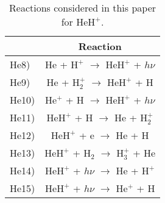 \documentclass[baaa]{baaa}
\begin{document}
\begin{table}[h!]
    \caption{Reactions considered in this paper for  $\mathrm{HeH^+}$.}
    \label{reacciones}


\centering
\begin{tabular}{lc} 

\hline\hline\noalign{\smallskip}
&  Reaction \\
\hline\noalign{\smallskip}

He8) & $\mathrm{He}$ + $\mathrm{H^+}$ $\longrightarrow$ $\mathrm{HeH^+}$ + $h\nu$ \\



He9)& $\mathrm{He}$ + $\mathrm{H_2 ^+}$ $\longrightarrow$ $\mathrm{HeH^+}$ + $\mathrm{H}$ \\

He10)& $\mathrm{He^+}$ + $\mathrm{H}$ $\longrightarrow$ $\mathrm{HeH^+}$ + $h\nu$ \\

He11)& $\mathrm{HeH^+}$ + $\mathrm{H}$ $\longrightarrow$ $\mathrm{He}$ + $\mathrm{H_2 ^+}$ \\

He12)& $\mathrm{HeH^+}$ + e $\longrightarrow$ $\mathrm{He}$ + $\mathrm{H}$ \\
He13) & $\mathrm{HeH^+}$ + $\mathrm{H_2}$ $\longrightarrow$ $\mathrm{H_3^+}$ + $\mathrm{He}$ \\
He14)& $\mathrm{HeH^+}$ + $h\nu$ $\longrightarrow$ $\mathrm{He}$ + $\mathrm{H^+}$  \\

He15)& $\mathrm{HeH^+}$ + $h\nu$ $\longrightarrow$ $\mathrm{He^+}$ + $\mathrm{H}$  \\ \hline
    
    \end{tabular}

\end{table}
\end{document}

